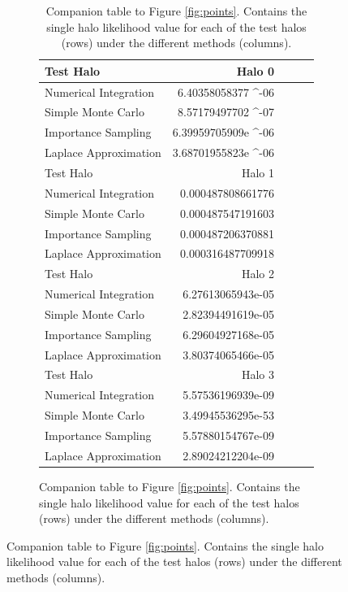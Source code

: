 \documentclass[\docopts]{\docclass}
\begin{document}
\begin{figure}[h!]
\begin{figure}[h!]
\begin{table}[h]
\centering
\begin{tabular}{|l|r|r|r|r|}
\hline
Test Halo & Halo 0\\
\hline
Numerical Integration & 6.40358058377 \times 10^{-06}\\
Simple Monte Carlo & 8.57179497702 \times 10 ^{-07}\\
Importance Sampling & 6.39959705909e \times 10 ^{-06}\\
Laplace Approximation & 3.68701955823e \times 10 ^{-06}\\
\hline
Test Halo & Halo 1\\
\hline
Numerical Integration & 0.000487808661776\\
Simple Monte Carlo & 0.000487547191603\\
Importance Sampling & 0.000487206370881\\
Laplace Approximation & 0.000316487709918\\
\hline
Test Halo & Halo 2\\
\hline
Numerical Integration & 6.27613065943e-05\\
Simple Monte Carlo & 2.82394491619e-05\\
Importance Sampling & 6.29604927168e-05\\
Laplace Approximation & 3.80374065466e-05\\
\hline
Test Halo & Halo 3\\
\hline
Numerical Integration & 5.57536196939e-09\\
Simple Monte Carlo & 3.49945536295e-53\\
Importance Sampling & 5.57880154767e-09\\
Laplace Approximation & 2.89024212204e-09\\
\hline
\end{tabular}
\caption{
Companion table to Figure \ref{fig:points}. Contains the single halo likelihood value for each of the test halos (rows) under the different methods (columns).
\label{tab:points}}
\end{table}


\end{figure}
\end{figure}
\end{document}
